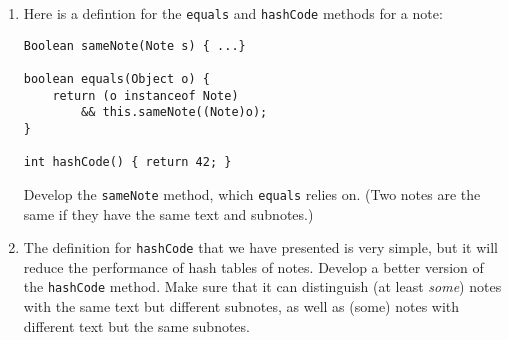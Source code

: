 \documentclass[12pt]{article}                   %
\begin{document}
\begin{problem}
\begin{enumerate}
\ifrubric
\else
{}
\fi
\newpage

\noindent
\item Here is a defintion for the \texttt{equals} and \texttt{hashCode}
methods for a note:

\begin{verbatim}
Boolean sameNote(Note s) { ...}

boolean equals(Object o) {
    return (o instanceof Note) 
        && this.sameNote((Note)o);
}

int hashCode() { return 42; }
\end{verbatim}

\noindent
Develop the \texttt{sameNote} method, which \texttt{equals} relies on.
(Two notes are the same if they have the same text and subnotes.)

\ifrubric
\else
{}
\fi
\newpage

\noindent
\item The definition for \texttt{hashCode} that we have presented is
  very simple, but it will reduce the performance of hash tables of
  notes.  Develop a better version of the \texttt{hashCode} method.
  Make sure that it can distinguish (at least \emph{some}) notes with
  the same text but different subnotes, as well as (some)
  notes with different text but the same subnotes.

\ifrubric
\else
{}
\fi
\newpage
\newpage
\end{enumerate}
\end{problem}


\end{document}
